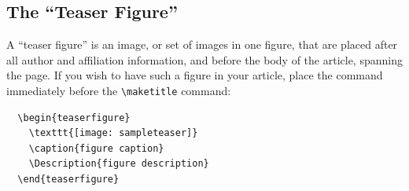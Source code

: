 \subsection{The ``Teaser Figure''}

A ``teaser figure'' is an image, or set of images in one figure, that
are placed after all author and affiliation information, and before
the body of the article, spanning the page. If you wish to have such a
figure in your article, place the command immediately before the
\verb|\maketitle| command:
\begin{verbatim}
  \begin{teaserfigure}
    \texttt{[image: sampleteaser]}
    \caption{figure caption}
    \Description{figure description}
  \end{teaserfigure}
\end{verbatim}
